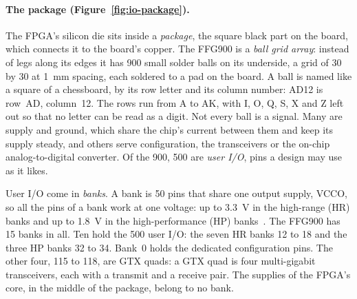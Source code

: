 \documentclass[11pt,a4paper]{report}
\begin{document}
\paragraph{The package (Figure~\ref{fig:io-package}).} The FPGA's silicon die sits inside a
\emph{package}, the square black part on the board, which connects it to the board's copper.
The FFG900 is a \emph{ball grid array}: instead of legs along its edges it has 900 small solder
balls on its underside, a grid of 30 by 30 at 1~mm spacing, each soldered to a pad on the
board. A ball is named like a square of a chessboard, by its row letter and its column number:
AD12 is row~AD, column~12. The rows run from A to AK, with I, O, Q, S, X and Z left out so that
no letter can be read as a digit. Not every ball is a signal. Many are supply and ground,
which share the chip's current between them and keep its supply steady, and others serve
configuration, the transceivers or the on-chip analog-to-digital converter. Of the 900, 500
are \emph{user I/O}, pins a design may use as it likes.

User I/O come in \emph{banks}. A bank is 50 pins that share one output supply, VCCO, so all
the pins of a bank work at one voltage: up to 3.3~V in the high-range (HR) banks and up to
1.8~V in the high-performance (HP) banks~\cite{ug471}. The FFG900 has 15 banks in all. Ten
hold the 500 user I/O: the seven HR banks 12 to 18 and the three HP banks 32 to 34. Bank~0
holds the dedicated configuration pins. The other four, 115 to 118, are GTX quads: a GTX quad
is four multi-gigabit transceivers, each with a transmit and a receive pair. The supplies of
the FPGA's core, in the middle of the package, belong to no bank.
\end{document}
